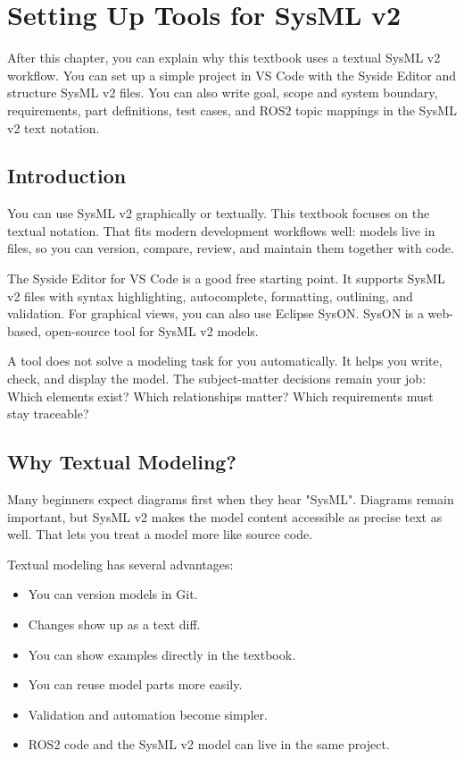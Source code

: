 \chapter{Setting Up Tools for SysML v2}

\begin{lernziele}
After this chapter, you can explain why this textbook uses a textual SysML v2 workflow. You can set up a simple project in VS Code with the Syside Editor and structure SysML v2 files. You can also write goal, scope and system boundary, requirements, part definitions, test cases, and ROS2 topic mappings in the SysML v2 text notation.
\end{lernziele}

\section{Introduction}
You can use SysML v2 graphically or textually. This textbook focuses on the textual notation. That fits modern development workflows well: models live in files, so you can version, compare, review, and maintain them together with code.

The Syside Editor for VS Code is a good free starting point. It supports SysML v2 files with syntax highlighting, autocomplete, formatting, outlining, and validation. For graphical views, you can also use Eclipse SysON. SysON is a web-based, open-source tool for SysML v2 models.

\begin{hinweisbox}
A tool does not solve a modeling task for you automatically. It helps you write, check, and display the model. The subject-matter decisions remain your job: Which elements exist? Which relationships matter? Which requirements must stay traceable?
\end{hinweisbox}

\section{Why Textual Modeling?}
Many beginners expect diagrams first when they hear "SysML". Diagrams remain important, but SysML v2 makes the model content accessible as precise text as well. That lets you treat a model more like source code.

Textual modeling has several advantages:

\begin{itemize}
    \item You can version models in Git.
    \item Changes show up as a text diff.
    \item You can show examples directly in the textbook.
    \item You can reuse model parts more easily.
    \item Validation and automation become simpler.
    \item ROS2 code and the SysML v2 model can live in the same project.
\end{itemize}


